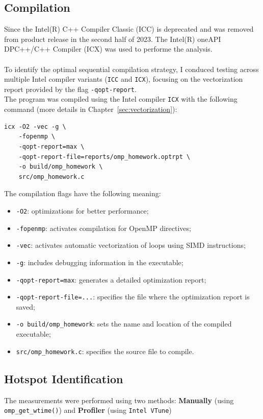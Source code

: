 \subsection{Compilation}
Since the Intel(R) C++ Compiler Classic (ICC) is deprecated and was removed from product release in the second half of 2023. The Intel(R) oneAPI DPC++/C++ Compiler (ICX) was used to performe the analysis.\\
\\
To identify the optimal sequential compilation strategy, I conduced testing across multiple Intel compiler variants (\texttt{ICC} and \texttt{ICX}), focusing on the vectorization report provided by the flag \texttt{-qopt-report}.\\
The program was compiled using the Intel compiler \texttt{ICX} with the following command (more details in Chapter~\ref{sec:vectorization}):
\begin{verbatim}
icx -O2 -vec -g \
    -fopenmp \
    -qopt-report=max \
    -qopt-report-file=reports/omp_homework.optrpt \
    -o build/omp_homework \
    src/omp_homework.c
\end{verbatim}

The compilation flags have the following meaning:
\begin{itemize}
    \item \texttt{-O2}: optimizations for better performance;
    \item \texttt{-fopenmp}: activates compilation for OpenMP directives;
    \item \texttt{-vec}: activates automatic vectorization of loops using SIMD instructions;
    \item \texttt{-g}: includes debugging information in the executable;
    \item \texttt{-qopt-report=max}: generates a detailed optimization report;
    \item \texttt{-qopt-report-file=...}: specifies the file where the optimization report is saved;
    \item \texttt{-o build/omp\_homework}: sets the name and location of the compiled executable;
    \item \texttt{src/omp\_homework.c}: specifies the source file to compile.
\end{itemize}


\subsection{Hotspot Identification}
The measurements were performed using two methods: \textbf{Manually} (using \texttt{omp\_get\_wtime()}) and \textbf{Profiler} (using \texttt{Intel VTune})

